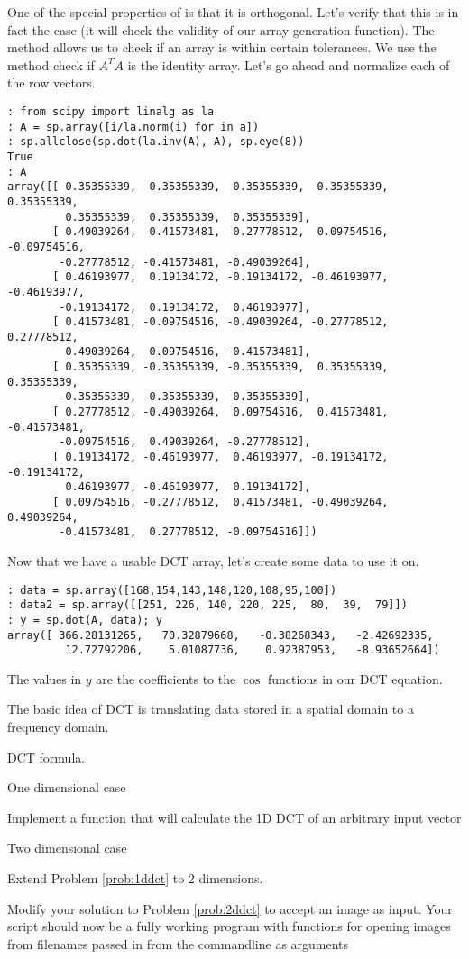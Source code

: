 One of the special properties of  is that it is orthogonal.  Let's verify that this is in fact the case (it will check the validity of our array generation function).  The  method allows us to check if an array is within certain tolerances.  We use the method check if $A^TA$ is the identity array.  Let's go ahead and normalize each of the row vectors.
\begin{lstlisting}
: from scipy import linalg as la
: A = sp.array([i/la.norm(i) for in a])
: sp.allclose(sp.dot(la.inv(A), A), sp.eye(8))
True
: A
array([[ 0.35355339,  0.35355339,  0.35355339,  0.35355339,  0.35355339,
         0.35355339,  0.35355339,  0.35355339],
       [ 0.49039264,  0.41573481,  0.27778512,  0.09754516, -0.09754516,
        -0.27778512, -0.41573481, -0.49039264],
       [ 0.46193977,  0.19134172, -0.19134172, -0.46193977, -0.46193977,
        -0.19134172,  0.19134172,  0.46193977],
       [ 0.41573481, -0.09754516, -0.49039264, -0.27778512,  0.27778512,
         0.49039264,  0.09754516, -0.41573481],
       [ 0.35355339, -0.35355339, -0.35355339,  0.35355339,  0.35355339,
        -0.35355339, -0.35355339,  0.35355339],
       [ 0.27778512, -0.49039264,  0.09754516,  0.41573481, -0.41573481,
        -0.09754516,  0.49039264, -0.27778512],
       [ 0.19134172, -0.46193977,  0.46193977, -0.19134172, -0.19134172,
         0.46193977, -0.46193977,  0.19134172],
       [ 0.09754516, -0.27778512,  0.41573481, -0.49039264,  0.49039264,
        -0.41573481,  0.27778512, -0.09754516]])
\end{lstlisting}

Now that we have a usable DCT array, let's create some data to use it on.
\begin{lstlisting}
: data = sp.array([168,154,143,148,120,108,95,100])
: data2 = sp.array([[251, 226, 140, 220, 225,  80,  39,  79]])
: y = sp.dot(A, data); y
array([ 366.28131265,   70.32879668,   -0.38268343,   -2.42692335,
         12.72792206,    5.01087736,    0.92387953,   -8.93652664])
\end{lstlisting}

The values in $y$ are the coefficients to the $\cos$ functions in our DCT equation.  

The basic idea of DCT is translating data stored in a spatial domain to a frequency domain.

DCT formula.

One dimensional case

\begin{problem}
\label{prob:1ddct}
Implement a function that will calculate the 1D DCT of an arbitrary input vector
\end{problem}


Two dimensional case
\begin{problem}
\label{prob:2ddct}
Extend Problem \ref{prob:1ddct} to 2 dimensions.
\end{problem}

\begin{problem}
Modify your solution to Problem \ref{prob:2ddct} to accept an image as input.  Your script should now be a fully working program with functions for opening images from filenames passed in from the commandline as arguments
\end{problem}
